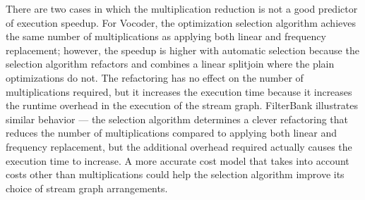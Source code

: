 There are two cases in which the multiplication reduction is not a
good predictor of execution speedup.  For Vocoder, the optimization
selection algorithm achieves the same number of multiplications as
applying both linear and frequency replacement; however, the speedup
is higher with automatic selection because the selection algorithm
refactors and combines a linear splitjoin where the plain
optimizations do not. The refactoring has no effect on the number of
multiplications required, but it increases the execution time because
it increases the runtime overhead in the execution of the stream
graph.  FilterBank illustrates similar behavior --- the selection
algorithm determines a clever refactoring that reduces the number of
multiplications compared to applying both linear and frequency
replacement, but the additional overhead required actually causes the
execution time to increase. A more accurate cost model that takes into
account costs other than multiplications could help the selection
algorithm improve its choice of stream graph arrangements.

